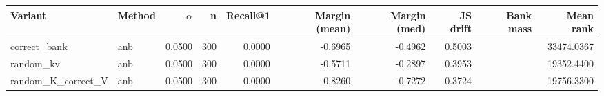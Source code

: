 \begin{tabular}{l l r r r r r r r r}
\toprule
Variant & Method & $\alpha$ & n & Recall@1 & Margin (mean) & Margin (med) & JS drift & Bank mass & Mean rank \\
\midrule
correct\_bank & anb & 0.0500 & 300 & 0.0000 & -0.6965 & -0.4962 & 0.5003 &  & 33474.0367 \\
random\_kv & anb & 0.0500 & 300 & 0.0000 & -0.5711 & -0.2897 & 0.3953 &  & 19352.4400 \\
random\_K\_correct\_V & anb & 0.0500 & 300 & 0.0000 & -0.8260 & -0.7272 & 0.3724 &  & 19756.3300 \\
\bottomrule
\end{tabular}

